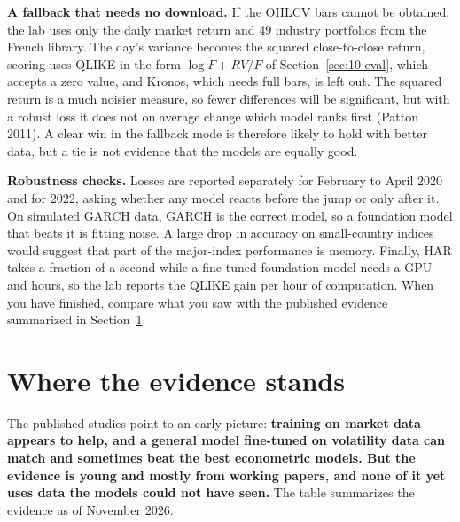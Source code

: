 \textbf{A fallback that needs no download.} If the OHLCV bars cannot be obtained, the lab uses only the daily market return and 49 industry portfolios from the French library. The day's variance becomes the squared close-to-close return, scoring uses QLIKE in the form $\log F + RV/F$ of Section~\ref{sec:10-eval}, which accepts a zero value, and Kronos, which needs full bars, is left out. The squared return is a much noisier measure, so fewer differences will be significant, but with a robust loss it does not on average change which model ranks first (Patton 2011). A clear win in the fallback mode is therefore likely to hold with better data, but a tie is not evidence that the models are equally good.


\label{sec:23-stress}
\textbf{Robustness checks.} Losses are reported separately for February to April 2020 and for 2022, asking whether any model reacts before the jump or only after it. On simulated GARCH data, GARCH is the correct model, so a foundation model that beats it is fitting noise. A large drop in accuracy on small-country indices would suggest that part of the major-index performance is memory. Finally, HAR takes a fraction of a second while a fine-tuned foundation model needs a GPU and hours, so the lab reports the QLIKE gain per hour of computation. When you have finished, compare what you saw with the published evidence summarized in Section~\ref{sec:23-verdict}.

\section{Where the evidence stands}
\label{sec:23-verdict}

The published studies point to an early picture: \textbf{training on market data appears to help, and a general model fine-tuned on volatility data can match and sometimes beat the best econometric models. But the evidence is young and mostly from working papers, and none of it yet uses data the models could not have seen.} The table summarizes the evidence as of November 2026.


